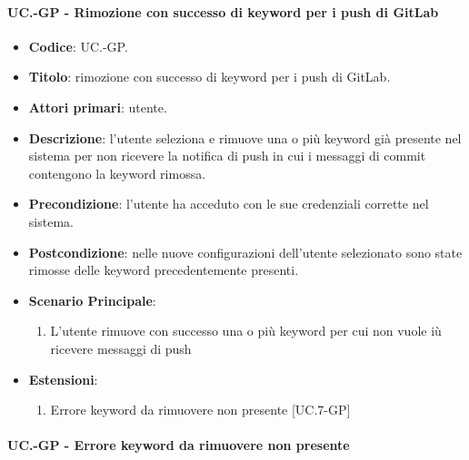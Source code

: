 	\paragraph{UC\theuccount.\thesubuccount-GP - Rimozione con successo di keyword per i push di GitLab}
	
	\begin{itemize}
		\item \textbf{Codice}: UC\theuccount.\thesubuccount-GP.
		\item \textbf{Titolo}: rimozione con successo di keyword per i push di GitLab.
		\item \textbf{Attori primari}: utente.
		\item \textbf{Descrizione}: l’utente seleziona e rimuove una o più keyword già presente nel sistema per non ricevere la notifica di push in
		cui i messaggi di commit contengono la keyword rimossa.
		\item \textbf{Precondizione}:  l’utente ha acceduto con le sue credenziali corrette nel sistema.
		\item \textbf{Postcondizione}: nelle nuove configurazioni dell'utente selezionato sono state rimosse delle keyword precedentemente presenti.
		\item \textbf{Scenario Principale}:
		\begin{enumerate}
			\item L'utente rimuove con successo una o più keyword per cui non vuole iù ricevere messaggi di push
		\end{enumerate}
		\item \textbf{Estensioni}:
		\begin{enumerate}
			\item Errore keyword da rimuovere non presente [UC\theuccount.7-GP]
		\end{enumerate}
	\end{itemize}
	
	\paragraph{UC\theuccount.\thesubuccount-GP - Errore keyword da rimuovere non presente}
	
